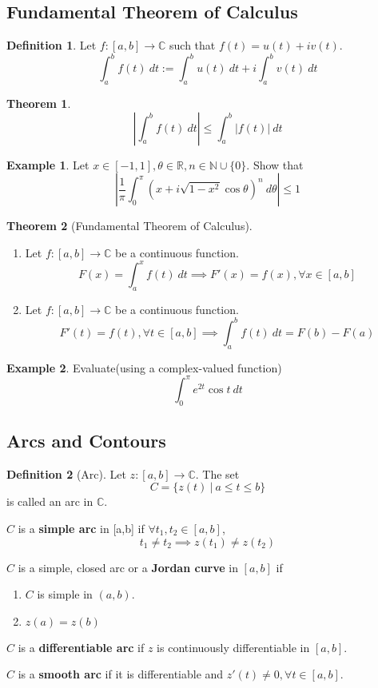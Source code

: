 \documentclass[10pt, a4paper]{extarticle}
\theoremstyle{definition}
\newtheorem{thm}{Theorem}
\newtheorem{defn}{Definition}
\newtheorem{eg}{Example}
\begin{document}
	\subsection{Fundamental Theorem of Calculus}
	\begin{defn}
		Let $f:[a,b]\to\mathbb{C}$ such that $f(t)=u(t)+iv(t)$.
		\[\int_{a}^bf(t)\ dt:=\int_a^bu(t)\ dt+i\int_a^bv(t)\ dt\]
	\end{defn}
	\begin{thm}
		\[\left|\int_{a}^bf(t)\ dt\right|\leq\int_{a}^b|f(t)|\ dt\]
	\end{thm}
	\begin{eg}
		Let $x\in[-1,1],\theta\in\mathbb{R}, n\in\mathbb{N}\cup\{0\}$. Show that
		\[\left|\frac{1}{\pi}\int_0^\pi (x+i\sqrt{1-x^2}\cos\theta)^n\ d\theta\right|\leq 1\]
	\end{eg}

	\begin{thm}[Fundamental Theorem of Calculus]
		\hfill
		\begin{enumerate}
			\item Let $f:[a,b]\to\mathbb{C}$ be a continuous function.
				\[F(x)=\int_a^x f(t)\ dt\implies F'(x)=f(x),\forall x\in[a,b]\]
			\item Let $f:[a,b]\to\mathbb{C}$ be a continuous function.
		\[F'(t)=f(t),\forall t\in[a,b]\implies\int_a^bf(t)\ dt=F(b)-F(a)\]
	\end{enumerate}
	\end{thm}
	\begin{eg}
		Evaluate(using a complex-valued function)\[\int_0^\pi e^{2t}\cos t\ dt\]
	\end{eg}

	\subsection{Arcs and Contours}
	\begin{defn}[Arc]
		Let $z:[a,b]\to\mathbb{C}$. The set
		\[C=\{z(t)\ |\ a\leq t\leq b\}\]
		is called an arc in $\mathbb{C}$.

		$C$ is a \textbf{simple arc} in [a,b] if $\forall t_1,t_2\in[a,b]$,\[t_1\neq t_2\implies z(t_1)\neq z(t_2)\]

		$C$ is a simple, closed arc or a \textbf{Jordan curve} in $[a,b]$ if
		\begin{enumerate}
			\item $C$ is simple in $(a,b)$.
			\item $z(a)=z(b)$
	\end{enumerate}
	
	$C$ is a \textbf{differentiable arc} if $z$ is continuously differentiable in $[a,b]$.

	$C$ is a \textbf{smooth arc} if it is differentiable and $z'(t)\neq 0,\forall t\in[a,b]$.
	\end{defn}
\end{document}
